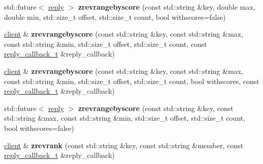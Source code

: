 \begin{DoxyCompactItemize}
\item 
\mbox{\label{classcpp__redis_1_1client_a80a36b6a67feb25b8b89712648c1085d}} 
std\+::future$<$ \hyperlink{classcpp__redis_1_1reply}{reply} $>$ {\bfseries zrevrangebyscore} (const std\+::string \&key, double max, double min, std\+::size\+\_\+t offset, std\+::size\+\_\+t count, bool withscores=false)
\item 
\mbox{\label{classcpp__redis_1_1client_a87288ccafc16ae91a7eb82b1a2cbf1a3}} 
\hyperlink{classcpp__redis_1_1client}{client} \& {\bfseries zrevrangebyscore} (const std\+::string \&key, const std\+::string \&max, const std\+::string \&min, std\+::size\+\_\+t offset, std\+::size\+\_\+t count, const \hyperlink{classcpp__redis_1_1client_a061a1140d36d2eaeda82b09a0bb3f9f2}{reply\+\_\+callback\+\_\+t} \&reply\+\_\+callback)
\item 
\mbox{\label{classcpp__redis_1_1client_a82f452e3cc4704d6b8b9bda95c528cd0}} 
\hyperlink{classcpp__redis_1_1client}{client} \& {\bfseries zrevrangebyscore} (const std\+::string \&key, const std\+::string \&max, const std\+::string \&min, std\+::size\+\_\+t offset, std\+::size\+\_\+t count, bool withscores, const \hyperlink{classcpp__redis_1_1client_a061a1140d36d2eaeda82b09a0bb3f9f2}{reply\+\_\+callback\+\_\+t} \&reply\+\_\+callback)
\item 
\mbox{\label{classcpp__redis_1_1client_a9cec46926423f6c7ff3a131443de424f}} 
std\+::future$<$ \hyperlink{classcpp__redis_1_1reply}{reply} $>$ {\bfseries zrevrangebyscore} (const std\+::string \&key, const std\+::string \&max, const std\+::string \&min, std\+::size\+\_\+t offset, std\+::size\+\_\+t count, bool withscores=false)
\item 
\mbox{\label{classcpp__redis_1_1client_a459f90ba39d9f9e90df5b756ec25db8b}} 
\hyperlink{classcpp__redis_1_1client}{client} \& {\bfseries zrevrank} (const std\+::string \&key, const std\+::string \&member, const \hyperlink{classcpp__redis_1_1client_a061a1140d36d2eaeda82b09a0bb3f9f2}{reply\+\_\+callback\+\_\+t} \&reply\+\_\+callback)
\item 
\mbox{\label{classcpp__redis_1_1client_a9870e21048277805b5eac2ce710089a0}} 

\end{DoxyCompactItemize}
